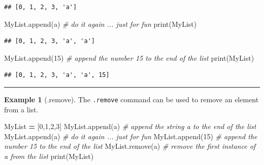 \documentclass[
]{book}
\newenvironment{Shaded}{\begin{snugshade}}{\end{snugshade}}
\newcommand{\BuiltInTok}[1]{#1}
\newcommand{\CommentTok}[1]{\textcolor[rgb]{0.56,0.35,0.01}{\textit{#1}}}
\newcommand{\DecValTok}[1]{\textcolor[rgb]{0.00,0.00,0.81}{#1}}
\newcommand{\NormalTok}[1]{#1}
\newcommand{\OperatorTok}[1]{\textcolor[rgb]{0.81,0.36,0.00}{\textbf{#1}}}
\newcommand{\StringTok}[1]{\textcolor[rgb]{0.31,0.60,0.02}{#1}}
\theoremstyle{definition}
\theoremstyle{definition}
\newtheorem{example}{Example}[chapter]
\theoremstyle{definition}
\theoremstyle{remark}
\begin{document}
\begin{verbatim}
## [0, 1, 2, 3, 'a']
\end{verbatim}

\begin{Shaded}
\begin{Highlighting}[]
\NormalTok{MyList.append(}\StringTok{\textquotesingle{}a\textquotesingle{}}\NormalTok{) }\CommentTok{\# do it again ... just for fun}
\BuiltInTok{print}\NormalTok{(MyList)}
\end{Highlighting}
\end{Shaded}

\begin{verbatim}
## [0, 1, 2, 3, 'a', 'a']
\end{verbatim}

\begin{Shaded}
\begin{Highlighting}[]
\NormalTok{MyList.append(}\DecValTok{15}\NormalTok{) }\CommentTok{\# append the number 15 to the end of the list}
\BuiltInTok{print}\NormalTok{(MyList)}
\end{Highlighting}
\end{Shaded}

\begin{verbatim}
## [0, 1, 2, 3, 'a', 'a', 15]
\end{verbatim}

\begin{center}\rule{0.5\linewidth}{0.5pt}\end{center}

\begin{example}[.remove]
\protect\hypertarget{exm:unnamed-chunk-647}{}{\label{exm:unnamed-chunk-647} {} }The \texttt{.remove} command can be used to remove an element from a list.
\end{example}

\begin{Shaded}
\begin{Highlighting}[]
\NormalTok{MyList }\OperatorTok{=}\NormalTok{ [}\DecValTok{0}\NormalTok{,}\DecValTok{1}\NormalTok{,}\DecValTok{2}\NormalTok{,}\DecValTok{3}\NormalTok{]}
\NormalTok{MyList.append(}\StringTok{\textquotesingle{}a\textquotesingle{}}\NormalTok{) }\CommentTok{\# append the string \textquotesingle{}a\textquotesingle{} to the end of the list}
\NormalTok{MyList.append(}\StringTok{\textquotesingle{}a\textquotesingle{}}\NormalTok{) }\CommentTok{\# do it again ... just for fun}
\NormalTok{MyList.append(}\DecValTok{15}\NormalTok{) }\CommentTok{\# append the number 15 to the end of the list}
\NormalTok{MyList.remove(}\StringTok{\textquotesingle{}a\textquotesingle{}}\NormalTok{) }\CommentTok{\# remove the first instance of \textasciigrave{}a\textasciigrave{} from the list}
\BuiltInTok{print}\NormalTok{(MyList)}
\end{Highlighting}
\end{Shaded}
\end{document}
